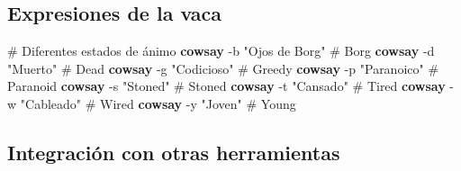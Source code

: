 \documentclass[
  11pt,
  letterpaper,
  oneside,
  openany]{scrbook}
\newenvironment{Shaded}{}{}
\newcommand{\AttributeTok}[1]{\textcolor[rgb]{0.84,0.23,0.29}{#1}}
\newcommand{\BuiltInTok}[1]{\textcolor[rgb]{0.84,0.23,0.29}{#1}}
\newcommand{\CommentTok}[1]{\textcolor[rgb]{0.42,0.45,0.49}{#1}}
\newcommand{\DataTypeTok}[1]{\textcolor[rgb]{0.84,0.23,0.29}{#1}}
\newcommand{\ExtensionTok}[1]{\textcolor[rgb]{0.84,0.23,0.29}{\textbf{#1}}}
\newcommand{\FunctionTok}[1]{\textcolor[rgb]{0.44,0.26,0.76}{#1}}
\newcommand{\KeywordTok}[1]{\textcolor[rgb]{0.84,0.23,0.29}{#1}}
\newcommand{\NormalTok}[1]{\textcolor[rgb]{0.14,0.16,0.18}{#1}}
\newcommand{\StringTok}[1]{\textcolor[rgb]{0.01,0.18,0.38}{#1}}
\newcommand{\VariableTok}[1]{\textcolor[rgb]{0.89,0.38,0.04}{#1}}
\begin{document}
\subsection{Expresiones de la vaca}\label{expresiones-de-la-vaca}

\begin{Shaded}
\begin{Highlighting}[]
\CommentTok{\# Diferentes estados de ánimo}
\ExtensionTok{cowsay} \AttributeTok{{-}b} \StringTok{"Ojos de Borg"}      \CommentTok{\# Borg}
\ExtensionTok{cowsay} \AttributeTok{{-}d} \StringTok{"Muerto"}            \CommentTok{\# Dead}
\ExtensionTok{cowsay} \AttributeTok{{-}g} \StringTok{"Codicioso"}         \CommentTok{\# Greedy}
\ExtensionTok{cowsay} \AttributeTok{{-}p} \StringTok{"Paranoico"}         \CommentTok{\# Paranoid}
\ExtensionTok{cowsay} \AttributeTok{{-}s} \StringTok{"Stoned"}            \CommentTok{\# Stoned}
\ExtensionTok{cowsay} \AttributeTok{{-}t} \StringTok{"Cansado"}           \CommentTok{\# Tired}
\ExtensionTok{cowsay} \AttributeTok{{-}w} \StringTok{"Cableado"}          \CommentTok{\# Wired}
\ExtensionTok{cowsay} \AttributeTok{{-}y} \StringTok{"Joven"}             \CommentTok{\# Young}
\end{Highlighting}
\end{Shaded}

\subsection{Integración con otras
herramientas}\label{integraciuxf3n-con-otras-herramientas-2}

\begin{Shaded}
\end{Shaded}
\end{document}
